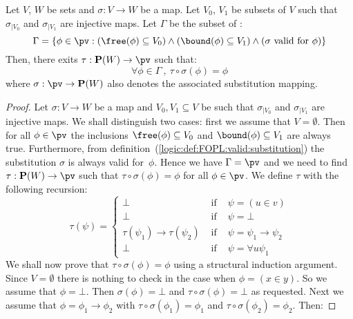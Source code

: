 \begin{theorem}\label{logic:the:FOPL:localinv:main}
Let $V$, $W$ be sets and $\sigma:V\to W$ be a map. Let $V_{0}$,
$V_{1}$ be subsets of $V$ such that $\sigma_{|V_{0}}$ and
$\sigma_{|V_{1}}$ are injective maps. Let $\Gamma$ be the subset of
\pv:
    \[
    \Gamma=\{\phi\in\pv:(\free(\phi)\subseteq
    V_{0})\land(\bound(\phi)\subseteq V_{1})\land(\mbox{$\sigma$
    valid for $\phi$})\}
    \]
Then, there exits $\tau:{\bf P}(W)\to\pv$ such that:
    \[
    \forall\phi\in\Gamma\ ,\ \tau\circ\sigma(\phi)=\phi
    \]
where $\sigma:\pv\to{\bf P}(W)$ also denotes the associated
substitution mapping.
\end{theorem}
\begin{proof}
Let $\sigma:V\to W$ be a map and $V_{0},V_{1}\subseteq V$ be such
that $\sigma_{|V_{0}}$ and $\sigma_{|V_{1}}$ are injective maps. We
shall distinguish two cases: first we assume that $V=\emptyset$.
Then for all $\phi\in\pv$ the inclusions $\free(\phi)\subseteq
V_{0}$ and $\bound(\phi)\subseteq V_{1}$ are always true.
Furthermore, from
definition~(\ref{logic:def:FOPL:valid:substitution}) the
substitution $\sigma$ is always valid for~$\phi$. Hence we have
$\Gamma=\pv$ and we need to find $\tau:{\bf P}(W)\to\pv$ such that
$\tau\circ\sigma(\phi)=\phi$ for all $\phi\in\pv$. We define $\tau$
with the following recursion:
    \begin{equation}\label{logic:eqn:FOPL:localinv:the:1}
                    \tau(\psi)=\left\{
                    \begin{array}{lcl}
                    \bot&\mbox{\ if\ }&\psi=(u\in v)\\
                    \bot&\mbox{\ if\ }&\psi=\bot\\
                    \tau(\psi_{1})\to\tau(\psi_{2})
                    &\mbox{\ if\ }&\psi=\psi_{1}\to\psi_{2}\\
                    \bot&
                    \mbox{\ if\ }&\psi=\forall u\psi_{1}
                    \end{array}\right.
    \end{equation}
We shall now prove that $\tau\circ\sigma(\phi)=\phi$ using a
structural induction argument.  Since $V=\emptyset$ there is nothing
to check in the case when $\phi=(x\in y)$. So we assume that
$\phi=\bot$. Then $\sigma(\phi)=\bot$ and
$\tau\circ\sigma(\phi)=\bot$ as requested. Next we assume that
$\phi=\phi_{1}\to\phi_{2}$ with $\tau\circ\sigma(\phi_{1})=\phi_{1}$
and $\tau\circ\sigma(\phi_{2})=\phi_{2}$. Then:

\end{proof}

